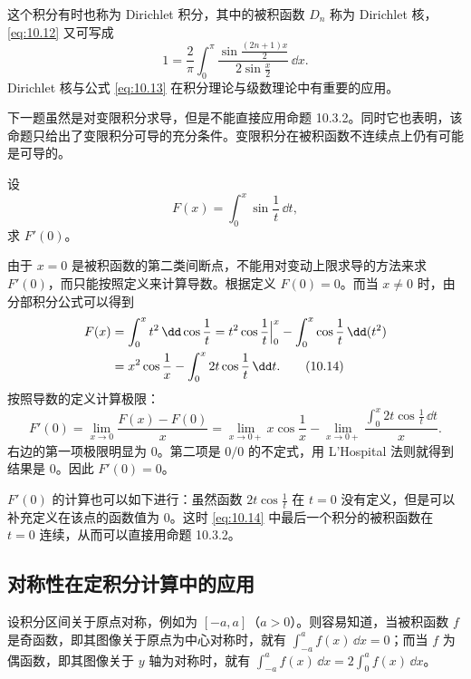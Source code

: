 \begin{xremark}
这个积分有时也称为 Dirichlet 积分，其中的被积函数 $D_n$ 称为 Dirichlet 核，\eqref{eq:10.12} 又可写成
\begin{equation}
  1=\frac2\pi\int_0^\pi\frac{\sin\frac{(2n+1)x}{2}}{2\sin\frac x2}\,\dd x.
  \tag{10.13}
  \label{eq:10.13}
\end{equation}
Dirichlet 核与公式 \eqref{eq:10.13} 在积分理论与级数理论中有重要的应用。
\end{xremark}

下一题虽然是对变限积分求导，但是不能直接应用命题 10.3.2。同时它也表明，该命题只给出了变限积分可导的充分条件。变限积分在被积函数不连续点上仍有可能是可导的。

\begin{xexample}[10.4.4]
设
\[
  F(x)=\int_0^x\sin\frac1t\,\dd t,
\]
求 $F'(0)$。
\end{xexample}
\begin{xsolution}
由于 $x=0$ 是被积函数的第二类间断点，不能用对变动上限求导的方法来求 $F'(0)$，而只能按照定义来计算导数。根据定义 $F(0)=0$。而当 $x\ne0$ 时，由分部积分公式可以得到
\begin{align}
  F(x)&=\int_0^x t^2\,\dd\cos\frac1t
  =t^2\cos\frac1t\Big|_0^x-\int_0^x\cos\frac1t\,\dd(t^2)\notag\\
  &=x^2\cos\frac1x-\int_0^x2t\cos\frac1t\,\dd t.
  \tag{10.14}
  \label{eq:10.14}
\end{align}
按照导数的定义计算极限：
\[
  F'(0)=\lim_{x\to0}\frac{F(x)-F(0)}x
  =\lim_{x\to0+}x\cos\frac1x
  -\lim_{x\to0+}\frac{\int_0^x2t\cos\frac1t\,\dd t}{x}.
\]
右边的第一项极限明显为 0。第二项是 $0/0$ 的不定式，用 L'Hospital 法则就得到结果是 0。因此 $F'(0)=0$。
\end{xsolution}

\begin{xremark}
$F'(0)$ 的计算也可以如下进行：虽然函数 $2t\cos\frac1t$ 在 $t=0$ 没有定义，但是可以补充定义在该点的函数值为 0。这时 \eqref{eq:10.14} 中最后一个积分的被积函数在 $t=0$ 连续，从而可以直接用命题 10.3.2。
\end{xremark}

\subsection{对称性在定积分计算中的应用}

设积分区间关于原点对称，例如为 $[-a,a]$（$a>0$）。则容易知道，当被积函数 $f$ 是奇函数，即其图像关于原点为中心对称时，就有 $\int_{-a}^a f(x)\,\dd x=0$；而当 $f$ 为偶函数，即其图像关于 $y$ 轴为对称时，就有 $\int_{-a}^a f(x)\,\dd x=2\int_0^a f(x)\,\dd x$。

